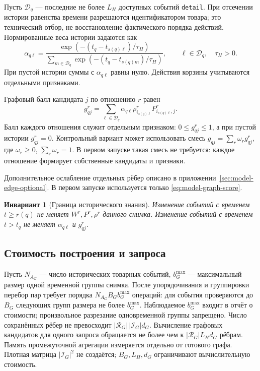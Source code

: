 \documentclass[12pt,a4paper]{article}
\newcommand{\code}[1]{{\ttfamily\small\nolinkurl{#1}}}
\theoremstyle{plainru}
\newtheorem{invariant}{Инвариант}[section]
\begin{document}
Пусть $\mathcal D_q$ --- последние не более $L_H$ доступных
событий \code{detail}. При отсечении истории равенства времени
разрешаются идентификатором товара; это технический отбор,
не восстановление фактического порядка действий.
Нормированные веса истории задаются как
\begin{equation}\label{eq:model-history-weight}
\alpha_{q\ell}=
\frac{\exp(-(t_q-t_{s(q)\ell})/\tau_H)}
 {\sum_{m\in\mathcal D_q}\exp(-(t_q-t_{s(q)m})/\tau_H)},
\qquad \ell\in\mathcal D_q,\quad\tau_H>0.
\end{equation}
При пустой истории суммы с $\alpha_{q\ell}$ равны нулю.
Действия корзины учитываются отдельными признаками.

Графовый балл кандидата $j$ по отношению $r$ равен
\begin{equation}\label{eq:model-graph-score}
g^r_{qj}=\sum_{\ell\in\mathcal D_q}
\alpha_{q\ell}\rho^r_{i_{s(q)\ell}}
P^r_{i_{s(q)\ell},j}.
\end{equation}
Балл каждого отношения служит отдельным признаком:
$0\le g^r_{qj}\le1$, а при пустой истории $g^r_{qj}=0$.
Контрольный вариант может использовать смесь
$g_{qj}=\sum_r\omega_r g^r_{qj}$, где
$\omega_r\ge0$, $\sum_r\omega_r=1$.
В первом запуске такая смесь не требуется:
каждое отношение формирует собственные кандидаты и признаки.

Дополнительное ослабление отдельных рёбер описано в приложении~\ref{sec:model-edge-optional}.
В первом запуске используется только \eqref{eq:model-graph-score}.

\begin{invariant}[Граница исторического знания]
Изменение событий с временем $t\ge r(q)$ не меняет
$W^r,P^r,\rho^r$ данного снимка. Изменение событий с временем
$t>t_q$ не меняет $\alpha_{q\ell}$ и $g^r_{qj}$.
\end{invariant}

\subsection{Стоимость построения и запроса}

Пусть $N_{A_G}$ --- число исторических товарных событий,
$b_G^{\max}$ --- максимальный размер одной временной группы снимка.
После упорядочивания и группировки перебор пар требует порядка
$N_{A_G}B_Gb_G^{\max}$ операций: для события проверяются до $B_G$
следующих групп размера не более $b_G^{\max}$.
Наблюдаемое $b_G^{\max}$ входит в отчёт о стоимости;
произвольное разрезание одновременной группы запрещено.
Число сохранённых рёбер не превосходит
$|\mathcal R_G|\,|\mathcal I_G|d_G$.
Вычисление графовых кандидатов для одного запроса обращается
не более чем к $|\mathcal R_G|L_Hd_G$ рёбрам.
Память промежуточной агрегации измеряется отдельно от готового графа.
Плотная матрица $|\mathcal I_G|^2$ не создаётся; $B_G,L_H,d_G$
ограничивают вычислительную стоимость.
\end{document}
